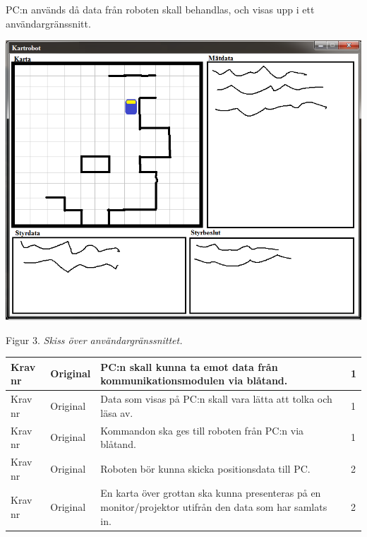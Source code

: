 \documentclass[11pt]{article}
\newcounter{kravc}
\newcommand{\kravcc}{
	\thekravc
	\stepcounter{kravc}
}
\begin{document}
\begin{flushleft}
PC:n används då data från roboten skall behandlas, och visas upp i ett användargränssnitt.
\\

\begin{center}
\includegraphics[scale=0.5]{anvandargranssnitt}

Figur 3. \textit{Skiss över användargränssnittet.}
\end{center}

\begin{center}
\begin{longtable}{|l|l|p{.70\linewidth}|l|} \hline

Krav nr\kravcc &
Original &
PC:n skall kunna ta emot data från kommunikationsmodulen via blåtand. &
1 \\ \hline

Krav nr\kravcc &
Original &
Data som visas på PC:n skall vara lätta att tolka och läsa av. &
1 \\ \hline

Krav nr\kravcc &
Original &
Kommandon ska ges till roboten från PC:n via blåtand. &
1 \\ \hline

Krav nr\kravcc &
Original &
Roboten bör kunna skicka positionsdata till PC. &
2 \\ \hline

Krav nr\kravcc &
Original &
En karta över grottan ska kunna presenteras på en monitor/projektor utifrån den data som har samlats in. &
2 \\ \hline
\end{longtable}
\end{center}



\end{flushleft}
\end{document}
